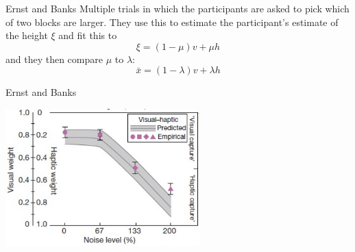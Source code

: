 \documentclass{beamer}
\newcommand{\crish}{\color{reddish}}
\newcommand{\cbla}{\color{black}}
\begin{document}
\begin{frame}{Ernst and Banks}
Multiple trials in which the participants are asked to pick which of
two blocks are larger. They use this to estimate the participant's
estimate of the height \crish$\xi$\cbla{} and fit this to
\crish$$
\xi=(1-\mu)v+\mu h
$$\cbla{}
and they then compare \crish$\mu$\cbla{} to \crish$\lambda$\cbla{}:
\crish$$
\bar{x}=(1-\lambda)v+\lambda h
$$\cbla{}
\end{frame}

\begin{frame}{Ernst and Banks}
\begin{center}
\includegraphics[width=7.5cm]{fig_weights.png}
\end{center}
\vfill
{}
\end{frame}
\end{document}
